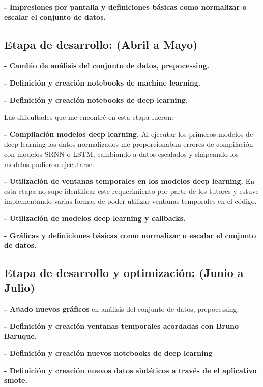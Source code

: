 \textbf{- Impresiones por pantalla y definiciones básicas como normalizar o escalar el conjunto de datos.}



\subsection{Etapa de desarrollo: (Abril a Mayo)}



\textbf{- Cambio de análisis del conjunto de datos, prepocessing.}

\textbf{- Definición y creación notebooks de machine learning.}

\textbf{- Definición y creación notebooks de deep learning.}


Las dificultades que me encontré en esta etapa fueron:

\textbf{- Compilación modelos deep learning. }Al ejecutar los primeros modelos de deep learning los datos normalizados me proporcionaban errores de compilación con modelos SRNN o LSTM, cambiando a datos escalados y shapeando los modelos pudieron ejecutarse.

\textbf{- Utilización de ventanas temporales en los modelos deep learning.} En esta etapa no supe identificar este requerimiento por parte de los tutores y estuve implementando varias formas de poder utilizar ventanas temporales en el código.

\textbf{- Utilización de modelos deep learning y callbacks.} 

\textbf{- Gráficas y definiciones básicas como normalizar o escalar el conjunto de datos.}


\subsection{Etapa de desarrollo y optimización: (Junio a Julio)}



\textbf{- Añado nuevos gráficos} en análisis del conjunto de datos, prepocessing.

\textbf{- Definición y creación ventanas temporales acordadas con Bruno Baruque.}

\textbf{- Definición y creación nuevos notebooks de deep learning}

\textbf{- Definición y creación nuevos datos sintéticos a través de el aplicativo smote.}

